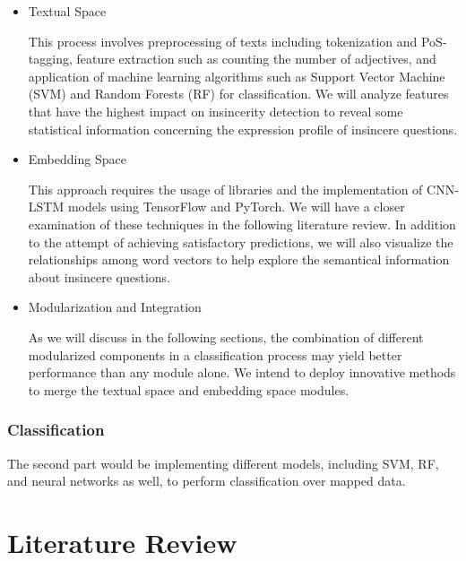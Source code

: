 \documentclass[12pt]{diazessay} %
\begin{document}
\begin{itemize}
	\item Textual Space

This process involves preprocessing of texts including tokenization and PoS-tagging, feature extraction such as counting the number of adjectives, and application of machine learning algorithms such as Support Vector Machine (SVM) and Random Forests (RF) for classification. We will analyze features that have the highest impact on insincerity detection to reveal some statistical information concerning the expression profile of insincere questions. 

	\item Embedding Space

This approach requires the usage of libraries and the implementation of CNN-LSTM models using TensorFlow and PyTorch. We will have a closer examination of these techniques in the following literature review. In addition to the attempt of achieving satisfactory predictions, we will also visualize the relationships among word vectors to help explore the semantical information about insincere questions.

	\item Modularization and Integration

As we will discuss in the following sections, the combination of different modularized components in a classification process may yield better performance than any module alone. We intend to deploy innovative methods to merge the textual space and embedding space modules. 	
\end{itemize}

\subsubsection{Classification}

The second part would be implementing different models, including SVM, RF, and neural networks as well, to perform classification over mapped data.


\section{Literature Review}

\end{document}
